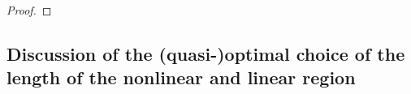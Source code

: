\begin{proof}
	
	
	
\end{proof}

\subsection{Discussion of the (quasi-)optimal choice of the length of the nonlinear and linear region}
\label{Balance of QNLL CG model}


